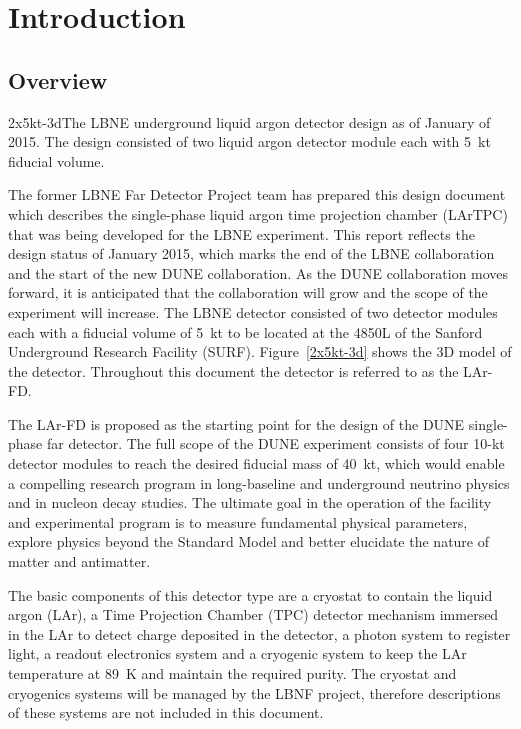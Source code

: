 \chapter{Introduction}

\section{Overview}
\begin{cdrfigure}{2x5kt-3d}{The LBNE underground liquid argon detector design as of January of 2015. The design consisted of two liquid argon detector module each with 5~kt fiducial volume.}
 \end{cdrfigure}

The former LBNE Far Detector Project team has prepared this design document which describes the single-phase liquid argon time projection chamber (LArTPC) that was being developed for the LBNE experiment. This report reflects the design status of January 2015, which marks the end of the LBNE collaboration and the start of the new DUNE collaboration. As the DUNE collaboration moves forward, it is anticipated that the collaboration will grow and the scope of the experiment will increase. The LBNE detector consisted of two detector modules each with a fiducial volume of 5~kt to be located at the 4850L of the Sanford Underground Research Facility (SURF). Figure~\ref{2x5kt-3d} shows the 3D model of the detector. Throughout this document the detector is referred to as the LAr-FD. 

The LAr-FD is proposed as the starting point for the design of the DUNE single-phase far detector. The full scope of the DUNE experiment consists of four 10-kt detector modules to reach the desired fiducial mass of 40~kt, which would enable a compelling research program in long-baseline and underground neutrino physics and in nucleon decay studies. The ultimate goal in the operation of the facility and experimental program is to measure fundamental physical parameters, explore physics beyond the Standard Model and better elucidate the nature of matter and antimatter. 

The basic components of this detector type are a cryostat to contain the liquid argon (LAr),  a  Time Projection Chamber (TPC) detector mechanism immersed in the LAr to detect charge deposited in the detector, a photon system to register light, a readout electronics system and a cryogenic system to keep the LAr temperature at 89~K and maintain the required purity.  The cryostat and cryogenics systems will be managed by the LBNF project, therefore descriptions of these systems are not included in this document. 

